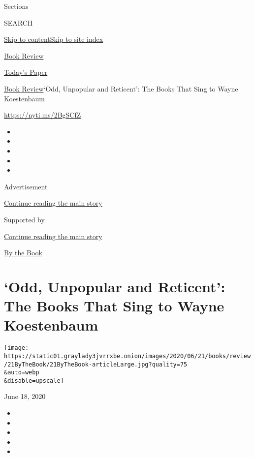 Sections

SEARCH

\protect\hyperlink{site-content}{Skip to
content}\protect\hyperlink{site-index}{Skip to site index}

\href{https://www.nytimes3xbfgragh.onion/section/books/review}{Book
Review}

\href{https://myaccount.nytimes3xbfgragh.onion/auth/login?response_type=cookie\&client_id=vi}{}

\href{https://www.nytimes3xbfgragh.onion/section/todayspaper}{Today's
Paper}

\href{/section/books/review}{Book Review}\textbar{}`Odd, Unpopular and
Reticent': The Books That Sing to Wayne Koestenbaum

\url{https://nyti.ms/2BgSCfZ}

\begin{itemize}
\item
\item
\item
\item
\item
\end{itemize}

Advertisement

\protect\hyperlink{after-top}{Continue reading the main story}

Supported by

\protect\hyperlink{after-sponsor}{Continue reading the main story}

\href{/column/by-the-book}{By the Book}

\hypertarget{odd-unpopular-and-reticent-the-books-that-sing-to-wayne-koestenbaum}{%
\section{`Odd, Unpopular and Reticent': The Books That Sing to Wayne
Koestenbaum}\label{odd-unpopular-and-reticent-the-books-that-sing-to-wayne-koestenbaum}}

\texttt{[image: https://static01.graylady3jvrrxbe.onion/images/2020/06/21/books/review/21ByTheBook/21ByTheBook-articleLarge.jpg?quality=75\\\&auto=webp\\\&disable=upscale]}

June 18, 2020

\begin{itemize}
\item
\item
\item
\item
\item
\end{itemize}

